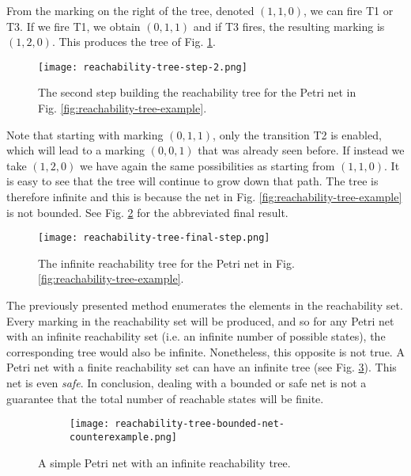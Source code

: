 \documentclass[../Thesis.tex]{subfiles}
\begin{document}
From the marking on the right of the tree, denoted $(1, 1, 0)$, we can fire T1 or T3.
If we fire T1, we obtain $(0, 1, 1)$ and if T3 fires, the resulting marking is $(1, 2, 0)$.
This produces the tree of Fig. \ref{fig:reachability-tree-step-2}.

\begin{figure}
    \centering
    \texttt{[image: reachability-tree-step-2.png]}
    \caption{The second step building the reachability tree
        for the Petri net in Fig. \ref{fig:reachability-tree-example}.}
    \label{fig:reachability-tree-step-2}
\end{figure}

Note that starting with marking $(0, 1, 1)$, only the transition T2 is enabled,
which will lead to a marking $(0, 0, 1)$ that was already seen before.
If instead we take $(1, 2, 0)$ we have again the same possibilities as starting from $(1, 1, 0)$.
It is easy to see that the tree will continue to grow down that path.
The tree is therefore infinite and this is because
the net in Fig. \ref{fig:reachability-tree-example} is not bounded.
See Fig. \ref{fig:reachability-tree-final-step} for the abbreviated final result.

\begin{figure}[!htb]
    \centering
    \texttt{[image: reachability-tree-final-step.png]}
    \caption{The infinite reachability tree for the Petri net in Fig. \ref{fig:reachability-tree-example}.}
    \label{fig:reachability-tree-final-step}
\end{figure}

The previously presented method enumerates the elements in the reachability set.
Every marking in the reachability set will be produced,
and so for any Petri net with an infinite reachability set (i.e. an infinite number of possible states),
the corresponding tree would also be infinite.
Nonetheless, this opposite is not true.
A Petri net with a finite reachability set can have an infinite tree
(see Fig. \ref{fig:reachability-tree-bounded-net-counterexample}).
This net is even \emph{safe}.
In conclusion, dealing with a bounded or safe net is not
a guarantee that the total number of reachable states will be finite.

\begin{figure}
    \centering
    \begin{subfigure}
        \centering
    \end{subfigure}
    \hspace{1.5cm}
    \begin{subfigure}
        \centering
        \texttt{[image: reachability-tree-bounded-net-counterexample.png]}
    \end{subfigure}
    \caption{A simple Petri net with an infinite reachability tree.}
    \label{fig:reachability-tree-bounded-net-counterexample}
\end{figure}
\end{document}
